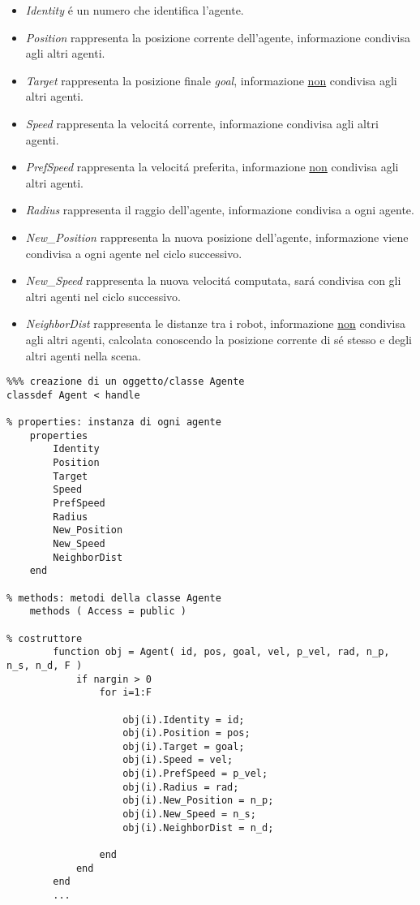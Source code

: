 \begin{itemize}
\item \textit{Identity} \'e un numero che identifica l'agente.
\item \textit{Position} rappresenta la posizione corrente dell'agente, informazione condivisa agli altri agenti.
\item \textit{Target} rappresenta la posizione finale \textit{goal}, informazione \underline{non} condivisa agli altri agenti.
\item \textit{Speed} rappresenta la velocit\'a corrente, informazione condivisa agli altri agenti.
\item \textit{PrefSpeed} rappresenta la velocit\'a preferita, informazione \underline{non} condivisa agli altri agenti.
\item \textit{Radius} rappresenta il raggio dell'agente, informazione condivisa a ogni agente.
\item \textit{New\_Position} rappresenta la nuova posizione dell'agente, informazione viene condivisa a ogni agente nel ciclo successivo.
\item \textit{New\_Speed} rappresenta la nuova velocit\'a computata, sar\'a condivisa con gli altri agenti nel ciclo successivo.
\item \textit{NeighborDist} rappresenta le distanze tra i robot, informazione \underline{non}  condivisa agli altri agenti, calcolata conoscendo la posizione corrente di s\'e stesso e degli altri agenti nella scena.
\end{itemize}

\begin{lstlisting}
%%% creazione di un oggetto/classe Agente
classdef Agent < handle

% properties: instanza di ogni agente
    properties
        Identity
        Position
        Target
        Speed
        PrefSpeed
        Radius
        New_Position
        New_Speed
        NeighborDist
    end

% methods: metodi della classe Agente
    methods ( Access = public )
    
% costruttore
        function obj = Agent( id, pos, goal, vel, p_vel, rad, n_p, n_s, n_d, F )
            if nargin > 0
                for i=1:F
                    
                    obj(i).Identity = id;
                    obj(i).Position = pos;
                    obj(i).Target = goal;
                    obj(i).Speed = vel;
                    obj(i).PrefSpeed = p_vel;
                    obj(i).Radius = rad;
                    obj(i).New_Position = n_p;
                    obj(i).New_Speed = n_s;
                    obj(i).NeighborDist = n_d;
                
                end
            end
        end
        ...
\end{lstlisting}


